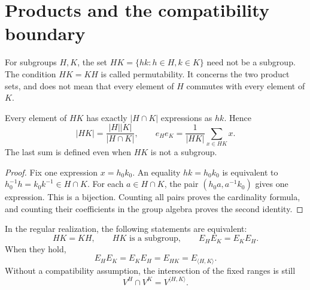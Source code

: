 \section{Products and the compatibility boundary}

For subgroups \(H,K\), the set \(HK=\{hk:h\in H,k\in K\}\) need not be a subgroup. The condition \(HK=KH\) is called permutability. It concerns the two product sets, and does not mean that every element of \(H\) commutes with every element of \(K\).

\begin{lemma}
\label{lem:b-product-multiplicity}
Every element of \(HK\) has exactly \(|H\cap K|\) expressions as \(hk\). Hence
\begin{equation}
 |HK|=\frac{|H||K|}{|H\cap K|},
 \qquad
 e_He_K=\frac1{|HK|}\sum_{x\in HK}x.
 \label{eq:b-product-support}
\end{equation}
The last sum is defined even when \(HK\) is not a subgroup.
\end{lemma}

\begin{proof}
Fix one expression \(x=h_0k_0\). An equality \(hk=h_0k_0\) is equivalent to \(h_0^{-1}h=k_0k^{-1}\in H\cap K\). For each \(a\in H\cap K\), the pair \((h_0a,a^{-1}k_0)\) gives one expression. This is a bijection. Counting all pairs proves the cardinality formula, and counting their coefficients in the group algebra proves the second identity.
\end{proof}

\begin{theorem}
\label{thm:b-compatible-averages}
In the regular realization, the following statements are equivalent:
\[
 HK=KH,\qquad HK\text{ is a subgroup},\qquad E_HE_K=E_KE_H.
\]
When they hold,
\begin{equation}
 E_HE_K=E_KE_H=E_{HK}=E_{\langle H,K\rangle}.
 \label{eq:b-compatible-product}
\end{equation}
Without a compatibility assumption, the intersection of the fixed ranges is still
\begin{equation}
 V^H\cap V^K=V^{\langle H,K\rangle}.
 \label{eq:b-fixed-intersection}
\end{equation}
\end{theorem}

